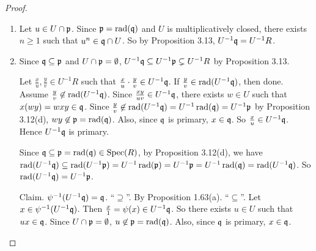 \begin{proof}
    \begin{enumerate}
        \item Let $u \in U \cap \mathfrak{p}$. Since $\mathfrak{p} = \operatorname{rad}(\mathfrak{q})$ and $U$ is multiplicatively closed, there exists $n \geq 1$ such that $u^{n} \in \mathfrak{q} \cap U$. So by Proposition 3.13, $U^{-1}\mathfrak{q} = U^{-1}R$.
        \item Since $\mathfrak{q} \subseteq \mathfrak{p}$ and $U \cap \mathfrak{p} = \emptyset$, $U^{-1}\mathfrak{q} \subseteq U^{-1}\mathfrak{p} \subsetneq U^{-1}R$ by Proposition 3.13. \par 
            Let $\frac{x}{u},\frac{y}{v} \in U^{-1}R$ such that $\frac{x}{u} \cdot \frac{y}{v} \in U^{-1}\mathfrak{q}$. If $\frac{y}{v} \in \operatorname{rad}(U^{-1}\mathfrak{q})$, then done. Assume $\frac{y}{v} \not \in \operatorname{rad}(U^{-1}\mathfrak{q})$. Since $\frac{xy}{uv} \in U^{-1}\mathfrak{q}$, there exists $w \in U$ such that $x(wy) = wxy \in \mathfrak{q}$. Since $\frac{y}{v} \not\in \operatorname{rad}(U^{-1}\mathfrak{q}) = U^{-1} \operatorname{rad}(\mathfrak{q}) = U^{-1}\mathfrak{p}$ by Proposition 3.12(d), $wy \not \in \mathfrak{p} = \operatorname{rad}(\mathfrak{q})$. Also, since $\mathfrak{q}$ is primary, $x \in \mathfrak{q}$. So $\frac{x}{u} \in U^{-1}\mathfrak{q}$. Hence $U^{-1}\mathfrak{q}$ is primary. \par
            Since $\mathfrak{q} \subseteq \mathfrak{p} = \operatorname{rad}(\mathfrak{q}) \in \operatorname{Spec}(R)$, by Proposition 3.12(d), we have $\operatorname{rad}(U^{-1}\mathfrak{q}) \subseteq \operatorname{rad}(U^{-1}\mathfrak{p}) = U^{-1} \operatorname{rad}(\mathfrak{p}) = U^{-1}\mathfrak{p} = U^{-1} \operatorname{rad}(\mathfrak{q}) = \operatorname{rad}(U^{-1}\mathfrak{q})$. So $\operatorname{rad}(U^{-1}\mathfrak{q}) = U^{-1}\mathfrak{p}$. \par
            Claim. $\psi^{-1}(U^{-1}\mathfrak{q}) = \mathfrak{q}$. ``$\supseteq$''. By Proposition 1.63(a). ``$\subseteq$''. Let $x \in \psi^{-1}(U^{-1}\mathfrak{q})$. Then $\frac{x}{1} = \psi(x) \in U^{-1}\mathfrak{q}$. So there exists $u \in U$ such that $ux \in \mathfrak{q}$. Since $U \cap \mathfrak{p} = \emptyset$, $u \not \in \mathfrak{p} = \operatorname{rad}(\mathfrak{q})$. Also, since $\mathfrak{q}$ is primary, $x \in \mathfrak{q}$. \qedhere
    \end{enumerate}
\end{proof}

